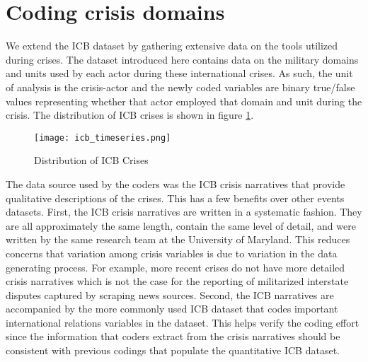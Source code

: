 \documentclass[12pt,letterpaper]{article}
\begin{document}
\section{Coding crisis domains}
We extend the ICB dataset by gathering extensive data on the tools utilized during crises. The dataset introduced here contains data on the military domains and units used by each actor during these international crises. As such, the unit of analysis is the crisis-actor and the newly coded variables are binary true/false values representing whether that actor employed that domain and unit during the crisis. The distribution of ICB crises is shown in figure \ref{fig:icb_distrib}.

\begin{figure}[H]
	\centering
	\texttt{[image: icb\_timeseries.png]}
	\caption{Distribution of ICB Crises}
	\label{fig:icb_distrib}
\end{figure} 

The data source used by the coders was the ICB crisis narratives that provide qualitative descriptions of the crises. This has a few benefits over other events datasets. First, the ICB crisis narratives are written in a systematic fashion. They are all approximately the same length, contain the same level of detail, and were written by the same research team at the University of Maryland. This reduces concerns that variation among crisis variables is due to variation in the data generating process. For example, more recent crises do not have more detailed crisis narratives which is not the case for the reporting of militarized interstate disputes captured by scraping news sources. Second, the ICB narratives are accompanied by the more commonly used ICB dataset that codes important international relations variables in the dataset. This helps verify the coding effort since the information that coders extract from the crisis narratives should be consistent with previous codings that populate the quantitative ICB dataset.
\end{document}
